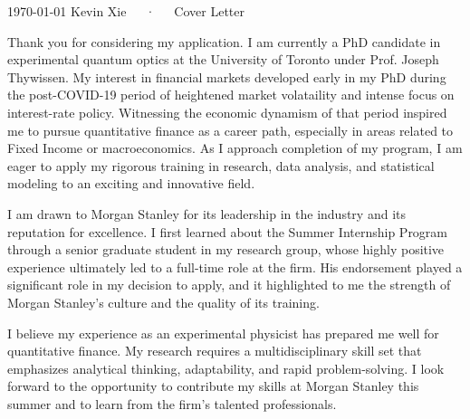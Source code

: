 \documentclass[11pt, a4paper]{awesome-cv}
\begin{document}

\makecvfooter
  {\today}
  {Kevin Xie~~~·~~~Cover Letter}
  {}

\makelettertitle

\begin{cvletter}

Thank you for considering my application. 
I am currently a PhD candidate in experimental quantum optics at the University of Toronto under Prof. Joseph Thywissen. 
My interest in financial markets developed early in my PhD during the post-COVID-19 period of heightened market volataility and intense focus on interest-rate policy. 
Witnessing the economic dynamism of that period inspired me to pursue quantitative finance as a career path, especially in areas related to Fixed Income or macroeconomics.
As I approach completion of my program, I am eager to apply my rigorous training in research, data analysis, and statistical modeling to an exciting and innovative field.


I am drawn to Morgan Stanley for its leadership in the industry and its reputation for excellence. 
I first learned about the Summer Internship Program through a senior graduate student in my research group, whose highly positive experience ultimately led to a full-time role at the firm. 
His endorsement played a significant role in my decision to apply, and it highlighted to me the strength of Morgan Stanley's culture and the quality of its training.

I believe my experience as an experimental physicist has prepared me well for quantitative finance. 
My research requires a multidisciplinary skill set that emphasizes analytical thinking, adaptability, and rapid problem-solving.
I look forward to the opportunity to contribute my skills at Morgan Stanley this summer and to learn from the firm's talented professionals.
\end{cvletter}


\makeletterclosing
\end{document}
